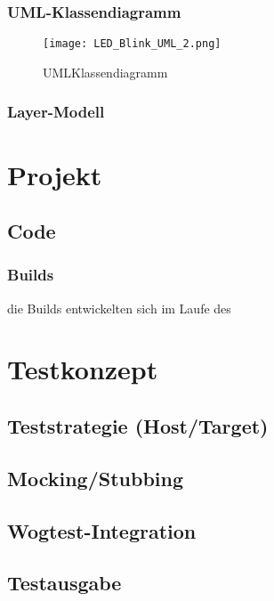 \documentclass[12pt,a4paper]{article}
\begin{document}
\subsubsection{UML-Klassendiagramm}
\begin{figure}[htbp]
  \centering
  \texttt{[image: LED\_Blink\_UML\_2.png]}
  \caption{UMLKlassendiagramm}
  \label{fig:uml_led_blink}
\end{figure}
\subsubsection{Layer-Modell}

\newpage

\section{Projekt}
\subsection{Code}
\subsubsection{Builds}
die Builds entwickelten sich im Laufe des
\


\newpage

\section{Testkonzept}
\subsection{Teststrategie (Host/Target)}
\subsection{Mocking/Stubbing}
\subsection{Wogtest-Integration}
\subsection{Testausgabe}

\newpage
\end{document}
